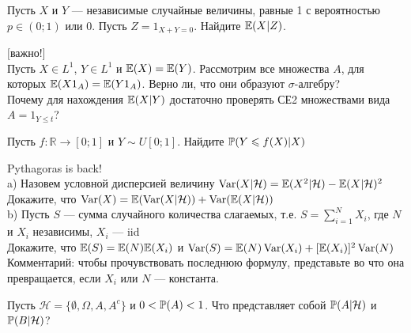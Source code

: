 \begin{problem}
Пусть $X$ и $Y$ --- независимые случайные величины, равные 1 с
вероятностью $p\in(0;1)$ или 0. Пусть $Z=1_{X+Y=0}$. Найдите
$\E(X|Z)$. 
\end{problem} 
\begin{solution} 

\end{solution}

\begin{problem}
 $[$важно!$]$ \\
 Пусть $X\in L^{1}$, $Y\in L^{1}$ и $\E(X)=\E(Y)$.
Рассмотрим все множества $A$, для которых $\E(X 1_{A})=\E(Y 1_{A})$.
Верно ли, что
они образуют $\sigma$-алгебру? \\
Почему для нахождения $\E(X|Y)$ достаточно проверять СЕ2
множествами вида $A=1_{Y\le t}$? 
\end{problem} 
\begin{solution} 

\end{solution}

\begin{problem}
Пусть $f:\mathbb{R}\rightarrow [0;1]$ и $Y\sim
U[0;1]$. Найдите $\P(Y\le f(X)|X)$ 
\end{problem} 
\begin{solution} 

\end{solution}

\begin{problem}
 Pythagoras is back! \\
a) Назовем условной дисперсией величину
$\Var(X|\mathcal{H})=\E(X^{2}|\mathcal{H})-\E(X|\mathcal{H})^{2}$ \\
Докажите, что
$\Var(X)=\E(\Var(X|\mathcal{H}))+\Var(\E(X|\mathcal{H}))$ \\
b) Пусть $S$ --- сумма случайного количества слагаемых, т.е.
$S=\sum_{i=1}^{N}X_{i}$, где $N$ и $X_{i}$ независимы, $X_{i}$ --- iid \\
Докажите, что $\E(S)=\E(N)\E(X_{i})$ и
$\Var(S)=\E(N)\Var(X_{i})+[\E(X_{i})]^{2}\Var(N)$ \\
Комментарий: чтобы прочувствовать последнюю формулу, представьте
во что она превращается, если $X_{i}$ или $N$ --- константа. 
\end{problem} 
\begin{solution} 

\end{solution}

\begin{problem}
Пусть $\mathcal{H}=\{\emptyset,\Omega,A,A^{c}\}$ и $0<\P(A)<1$. Что
представляет собой $\P(A|\mathcal{H})$ и $\P(B|\mathcal{H})$? 
\end{problem} 
\begin{solution} 

\end{solution}


